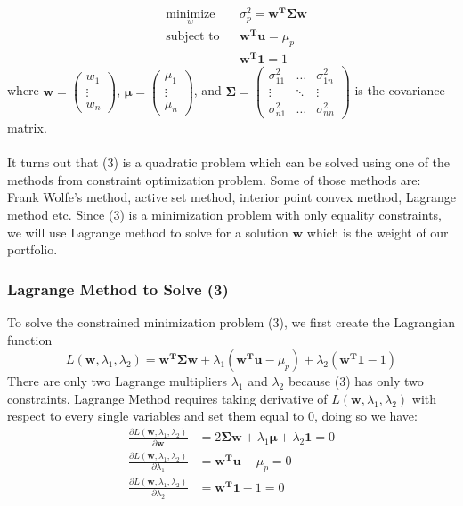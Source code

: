 \documentclass[12pt,titlepage,a4paper]{article}
\begin{document}
\begin{equation}
\begin{aligned}
& \underset{w}{\text{minimize}}
& &\sigma_p^2 = \mathbf{w^T\Sigma w}\\
& \text{subject to}
& & \mathbf{w^Tu} = \mu_p \\
&&& \mathbf{w^T1}=1
\end{aligned}
\end{equation}
where $\mathbf{w} = \begin{pmatrix} w_1 \\ \vdots \\ w_n \end{pmatrix}$, 
$\mathbf{\mu} = \begin{pmatrix} \mu_1 \\ \vdots \\ \mu_n \end{pmatrix}$, 
and $\mathbf{\Sigma} = \begin{pmatrix}\sigma_{11}^2 & \dots & \sigma_{1n}^2 \\ \vdots & \ddots & \vdots\\  \sigma_{n1}^2 & \dots & \sigma_{nn}^2 \end{pmatrix}$ is the covariance matrix.\\ \\ 
It turns out that (3) is a quadratic problem which can be solved using one of the methods from constraint optimization problem. Some of those methods are: Frank Wolfe's method, active set method, interior point convex method, Lagrange method etc. Since (3) is a minimization problem with only equality constraints, we will use Lagrange method to solve for a solution $\mathbf{w}$ which is the weight of our portfolio. 

\subsubsection{Lagrange Method to Solve (3)}

To solve the constrained minimization problem (3), we first create the Lagrangian function 
$$
L(\mathbf{w}, \lambda_1, \lambda_2) = \mathbf{w^T\Sigma w} + \lambda_1(\mathbf{w^Tu} - \mu_p) + \lambda_2(\mathbf{w^T1} - 1)
$$
There are only two Lagrange multipliers $\lambda_1$ and $\lambda_2$ because (3) has only two constraints. Lagrange Method requires taking derivative of $L(\mathbf{w}, \lambda_1, \lambda_2)$ with respect to every single variables and set them equal to 0, doing so we have: 
\begin{equation}
\begin{split}
\frac{\partial L(\mathbf{w}, \lambda_1, \lambda_2)}{\partial \mathbf{w}} &= 2\mathbf{\Sigma w} + \lambda_1\mathbf{\mu} + \lambda_2\mathbf{1} = 0 \\
\frac{\partial L(\mathbf{w}, \lambda_1, \lambda_2)}{\partial \lambda_1} &=  \mathbf{w^Tu} - \mu_p = 0\\
\frac{\partial L(\mathbf{w}, \lambda_1, \lambda_2)}{\partial \lambda_2} &= \mathbf{w^T1} - 1 = 0\\
\end{split}
\end{equation}
\end{document}
